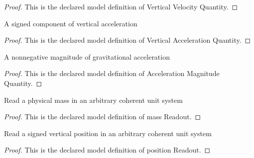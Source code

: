 \begin{proof}
  This is the declared model definition of Vertical Velocity Quantity.
\end{proof}
\begin{definition}
  \label{def:physics:phyx-mini-0810:phyxminiproblems-problemphyxmini0810-verticalaccelerationquantity}
  A signed component of vertical acceleration
\end{definition}
\begin{proof}
  This is the declared model definition of Vertical Acceleration Quantity.
\end{proof}
\begin{definition}
  \label{def:physics:phyx-mini-0810:phyxminiproblems-problemphyxmini0810-accelerationmagnitudequantity}
  A nonnegative magnitude of gravitational acceleration
\end{definition}
\begin{proof}
  This is the declared model definition of Acceleration Magnitude Quantity.
\end{proof}
\begin{definition}
  \label{def:physics:phyx-mini-0810:phyxminiproblems-problemphyxmini0810-massreadout}
  Read a physical mass in an arbitrary coherent unit system
\end{definition}
\begin{proof}
  This is the declared model definition of mass Readout.
\end{proof}
\begin{definition}
  \label{def:physics:phyx-mini-0810:phyxminiproblems-problemphyxmini0810-positionreadout}
  Read a signed vertical position in an arbitrary coherent unit system
\end{definition}
\begin{proof}
  This is the declared model definition of position Readout.
\end{proof}
